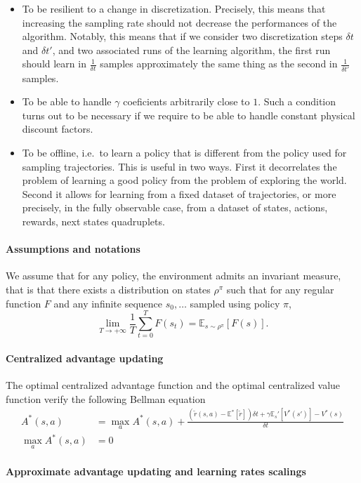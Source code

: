 \documentclass[11pt]{article}
\newcommand{\deltat}{{\delta t}}
\newcommand{\E}{\mathbb{E}}
\begin{document}
\begin{itemize}
	\item To be resilient to a change in discretization. Precisely, this
		means that increasing the sampling rate should not decrease the
		performances of the algorithm. Notably, this means that if we consider
		two discretization steps $\deltat$ and $\deltat'$, and two associated
		runs of the learning algorithm, the first run should learn in $\frac{1}{\deltat}$
		samples approximately the same thing as the second in $\frac{1}{\deltat'}$ samples.
	\item To be able to handle $\gamma$ coeficients arbitrarily close to $1$.
		Such a condition turns out to be necessary if we require to
		be able to handle constant physical discount factors.
	\item To be offline, i.e.\ to learn a policy that is different from
		the policy used for sampling trajectories. This is useful in
		two ways. First it decorrelates the problem of learning a good
		policy from the problem of exploring the world. Second it
		allows for learning from a fixed dataset of trajectories, or more
		precisely, in the fully observable case, from a dataset of
		states, actions, rewards, next states quadruplets.
\end{itemize}

\paragraph{Assumptions and notations}
We assume that for any policy, the environment admits an invariant
measure, that is that there exists a distribution on states $\rho^\pi$ such that for
any regular function $F$ and any infinite sequence $s_0, \ldots$ sampled using policy
$\pi$,
\begin{equation}
	\lim\limits_{T\to+\infty}
	\frac{1}{T}
	\sum\limits_{t=0}^T F(s_t) =
	\E_{s\sim \rho^\pi}\left[
		F(s)
	\right].
\end{equation}
\paragraph{Centralized advantage updating}
The optimal centralized advantage function and the optimal centralized value
function verify the following Bellman equation
\begin{align}
	A^*(s, a) &= \max\limits_{a} A^*(s, a) + \frac{
		(\tilde{r}(s, a) - \E^*\left[
			\tilde{r}
		\right]
		)\deltat + \gamma \E_s'\left[
			V^*(s')
		\right] - V^*(s)
		}{
		\deltat
	}\\
	\max\limits_{a} A^*(s, a) &= 0
\end{align}

\paragraph{Approximate advantage updating and learning rates scalings}
\end{document}
